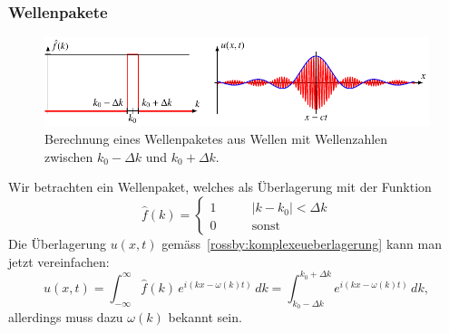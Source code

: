 \subsubsection{Wellenpakete}
\begin{figure}
\centering
\includegraphics{chapters/7/wellenpaket.pdf}
\caption{Berechnung eines Wellenpaketes aus Wellen mit Wellenzahlen
zwischen $k_0-\Delta k$ und $k_0+\Delta k$.
\label{rossby:wellenpaket}}
\end{figure}
Wir betrachten ein Wellenpaket, welches als Überlagerung mit der
Funktion
\[
\hat f(k)
=
\begin{cases}
1&\qquad |k-k_0| < \Delta k\\
0&\qquad\text{sonst}
\end{cases}
\]
Die Überlagerung $u(x,t)$ gemäss~\eqref{rossby:komplexeueberlagerung}
kann man jetzt vereinfachen:
\[
u(x,t)
=
\int_{-\infty}^\infty \hat f(k)\,e^{i(kx-\omega(k)t)}\,dk
=
\int_{k_0-\Delta k}^{k_0+\Delta k} e^{i(kx-\omega(k)t)}\,dk,
\]
allerdings muss dazu $\omega(k)$ bekannt sein.

